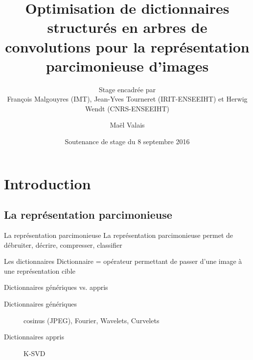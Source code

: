 


\title{Optimisation de dictionnaires structurés en arbres de convolutions pour la représentation parcimonieuse d'images}
\subtitle{Stage encadrée par\\François Malgouyres (IMT), Jean-Yves Tourneret (IRIT-ENSEEIHT) et Herwig Wendt (CNRS-ENSEEIHT)}



\date{Soutenance de stage du 8 septembre 2016}
\author{Maël Valais}



\maketitle


\section{Introduction}
\subsection{La représentation parcimonieuse}


\begin{frame}[label=LO]{La représentation parcimonieuse}
La \alert{représentation parcimonieuse} permet de débruiter, décrire, compresser, classifier
\end{frame}


\begin{frame}{Les dictionnaires}
Dictionnaire = opérateur permettant de passer d'une image à une représentation cible
\end{frame}


\begin{frame}{Dictionnaires génériques vs. appris}
\begin{description}
	\item[Dictionnaires génériques] cosinus (JPEG), Fourier, Wavelets, Curvelets
	\item[Dictionnaires appris] K-SVD
\end{description}
\end{frame}


